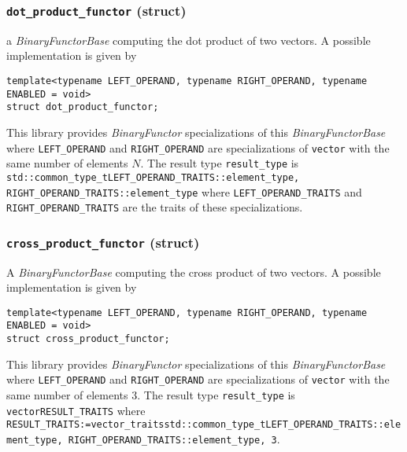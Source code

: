 \documentclass[oneside]{book}
\begin{document}
\subsubsection{\texttt{dot\_product\_functor} (struct)}
a \textit{BinaryFunctorBase} computing the dot product of two vectors.
A possible implementation is given by
\begin{verbatim}
template<typename LEFT_OPERAND, typename RIGHT_OPERAND, typename ENABLED = void>
struct dot_product_functor;
\end{verbatim}

This library provides \textit{BinaryFunctor} specializations of this \textit{BinaryFunctorBase}
where \texttt{LEFT\_OPERAND} and \texttt{RIGHT\_OPERAND} are specializations of \texttt{vector}
with the same number of elements $N$. The result type \texttt{result\_type}          is\newline
\texttt{std::common\_type\_t\textlangle LEFT\_OPERAND\_TRAITS::element\_type, RIGHT\_OPERAND\_TRAITS::element\_type\textrangle}\newline
 where \texttt{LEFT\_OPERAND\_TRAITS} and \texttt{RIGHT\_OPERAND\_TRAITS} are the traits of these specializations.

\subsubsection{\texttt{cross\_product\_functor} (struct)}
A \textit{BinaryFunctorBase} computing the cross product of two vectors.
A possible implementation is given by
\begin{verbatim}
template<typename LEFT_OPERAND, typename RIGHT_OPERAND, typename ENABLED = void>
struct cross_product_functor;
\end{verbatim}

This library provides \textit{BinaryFunctor} specializations of this \textit{BinaryFunctorBase}
where \texttt{LEFT\_OPERAND} and \texttt{RIGHT\_OPERAND} are specializations of \texttt{vector} with   the
same number of elements $3$. The result type \texttt{result\_type} is  \texttt{vector\textlangle RESULT\_TRAITS\textrangle}
where\newline
\texttt{
RESULT\_TRAITS:=vector\_traits\textlangle std::common\_type\_t\textlangle{}LEFT\_OPERAND\_TRAITS::element\_type,\newline%
\hphantom{RESULT\_TRAITS:=vector\_traits\textlangle std::common\_type\_t\textlangle}RIGHT\_OPERAND\_TRAITS::element\_type\textrangle,\newline%
\hphantom{RESULT\_TRAITS:=vector\_traits\textlangle}3\textrangle}.
\end{document}
